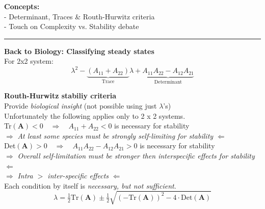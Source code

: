 \documentclass{article}
\newcommand{\ind}{\-\hspace{1cm}}
\begin{document}
\noindent{}

\textbf{Concepts:}\\
\ind - Determinant, Traces \& Routh-Hurwitz criteria\\
\ind - Touch on Complexity vs. Stability debate

\rule[0.5ex]{\linewidth}{1pt}

\textbf{Back to Biology:  Classifying steady states}\\
For 2x2 system:
\begin{equation*}
	\lambda^2 - \underbrace{(A_{11}+A_{22})}_{\text{Trace}}\lambda + \underbrace{A_{11}A_{22} - A_{12}A_{21}}_{\text{Determinant}}
\end{equation*}

\textbf{Routh-Hurwitz stabiliy criteria}\\
\ind \ind Provide \emph{biological insight} (not possible using just $\lambda$'s)\\
\ind \ind Unfortunately the following applies only to 2 x 2 systems.\\

\ind Tr$(\mathbf{A})<0 \quad \Rightarrow \quad A_{11}+A_{22}<0$ is necessary for stability\\
\ind \ind $\Rightarrow$ \emph{At least some species must be strongly self-limiting for stability} $\Leftarrow$ \\

\ind Det$(\mathbf{A})>0  \quad \Rightarrow \quad A_{11} A_{22} - A_{12} A_{21} > 0$ is necessary for stability\\
\ind \ind $\Rightarrow$ \emph{Overall self-limitation must be stronger then interspecific effects for stability} $\Leftarrow$\\
\ind \ind $\Rightarrow$ \emph{Intra $>$ inter-specific effects} $\Leftarrow$ \\

Each condition by itself is \emph{necessary, but not sufficient}.
\begin{equation*}
	\lambda = \tfrac{1}{2}\text{Tr}(\textbf{A}) \pm \tfrac{1}{2}\sqrt{(-\text{Tr}(\textbf{A}))^2 - 4\cdot\text{Det}(\textbf{A})}
\end{equation*}
\end{document}
